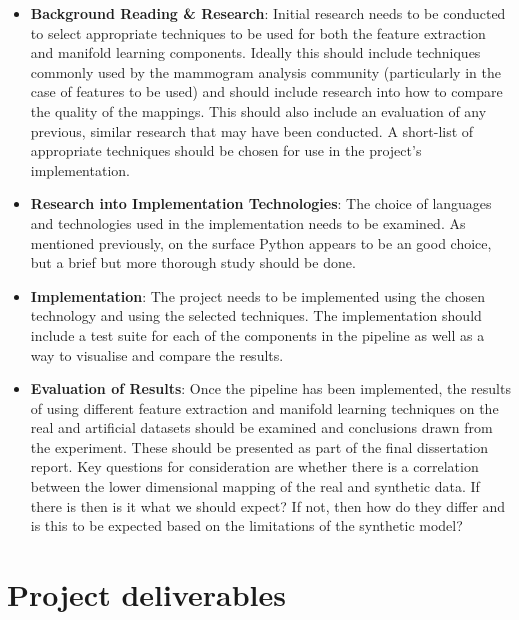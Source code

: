 \documentclass[11pt,fleqn,twoside]{article}
\begin{document}
\begin{itemize}
\item \textbf{Background Reading \& Research}: Initial research needs to be conducted to select appropriate techniques to be used for both the feature extraction and manifold learning components. Ideally this should include techniques commonly used by the mammogram analysis community (particularly in the case of features to be used) and should include research into how to compare the quality of the mappings. This should also include an evaluation of any previous, similar research that may have been conducted. A short-list of appropriate techniques should be chosen for use in the project's implementation.

\item \textbf{Research into Implementation Technologies}: The choice of languages and technologies used in the implementation needs to be examined. As mentioned previously, on the surface Python appears to be an good choice, but a brief but more thorough study should be done.

\item \textbf{Implementation}: The project needs to be implemented using the chosen technology and using the selected techniques. The implementation should include a test suite for each of the components in the pipeline as well as a way to visualise and compare the results.

\item \textbf{Evaluation of Results}: Once the pipeline has been implemented, the results of using different feature extraction and manifold learning techniques on the real and artificial datasets should be examined and conclusions drawn from the experiment. These should be presented as part of the final dissertation report. Key questions for consideration are whether there is a correlation between the lower dimensional mapping of the real and synthetic data. If there is then is it what we should expect? If not, then how do they differ and is this to be expected based on the limitations of the synthetic model?

\end{itemize}

\section{Project deliverables}
\end{document}
